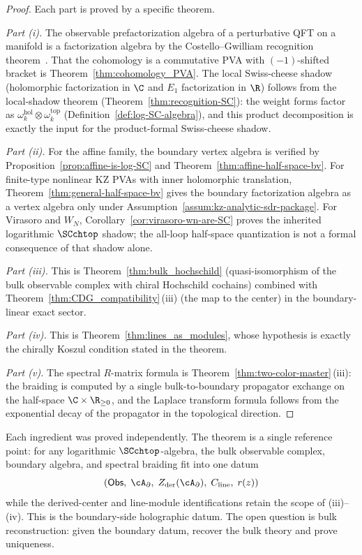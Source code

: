 \begin{proof}
Each part is proved by a specific theorem.

\emph{Part (i).}
The observable prefactorization algebra of a perturbative QFT on a
manifold is a factorization algebra by the Costello--Gwilliam
recognition theorem~\cite{CG17, CG21}. That the cohomology is a
commutative PVA with $(-1)$-shifted bracket is
Theorem~\ref{thm:cohomology_PVA}. The local Swiss-cheese shadow
(holomorphic factorization in $\C$ and $E_1$ factorization in $\R$)
follows from the local-shadow theorem
(Theorem~\ref{thm:recognition-SC}): the weight forms factor as
$\omega_k^{\mathrm{hol}} \otimes \omega_k^{\mathrm{top}}$
(Definition~\ref{def:log-SC-algebra}), and this product decomposition
is exactly the input for the product-formal Swiss-cheese shadow.

\emph{Part (ii).}
For the affine family, the boundary vertex algebra is verified by
Proposition~\ref{prop:affine-is-log-SC} and
Theorem~\ref{thm:affine-half-space-bv}. For finite-type nonlinear KZ
PVAs with inner holomorphic translation,
Theorem~\ref{thm:general-half-space-bv} gives the boundary
factorization algebra as a vertex algebra only under
Assumption~\ref{assum:kz-analytic-sdr-package}. For Virasoro and
$W_N$, Corollary~\ref{cor:virasoro-wn-are-SC} proves the inherited
logarithmic $\SCchtop$ shadow; the all-loop half-space quantization is
not a formal consequence of that shadow alone.

\emph{Part (iii).}
This is Theorem~\ref{thm:bulk_hochschild} (quasi-isomorphism of the
bulk observable complex with chiral Hochschild cochains) combined with
Theorem~\ref{thm:CDG_compatibility}\,(iii) (the map to the center) in
the boundary-linear exact sector.

\emph{Part (iv).}
This is Theorem~\ref{thm:lines_as_modules}, whose hypothesis is exactly
the chirally Koszul condition stated in the theorem.

\emph{Part (v).}
The spectral $R$-matrix formula is
Theorem~\ref{thm:two-color-master}\,(iii): the braiding is computed by
a single bulk-to-boundary propagator exchange on the half-space
$\C \times \R_{\ge 0}$, and the Laplace transform formula follows from
the exponential decay of the propagator in the topological direction.
\end{proof}

\begin{remark}
Each ingredient was proved independently. The theorem is a single reference point: for any
logarithmic $\SCchtop$-algebra, the bulk observable complex, boundary
algebra, and spectral braiding fit into one datum
\[
(\mathsf{Obs},\; \cA_\partial,\;
Z_{\mathrm{der}}(\cA_\partial),\;
C_{\mathrm{line}},\; r(z))
\]
while the derived-center and line-module identifications retain the scope of (iii)--(iv). This is the boundary-side holographic datum.
The open question is bulk reconstruction: given the boundary datum,
recover the bulk theory and prove uniqueness.
\end{remark}

